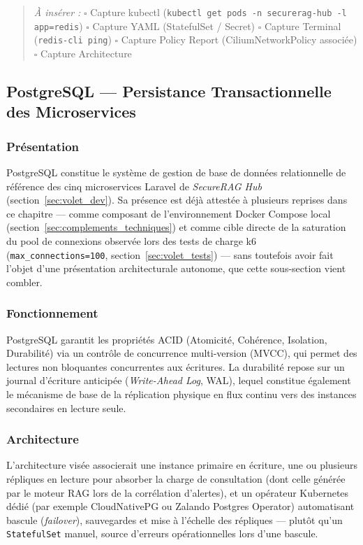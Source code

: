 \begin{quote}
\scriptsize
\textit{À insérer :} \quad
$\square$ Capture kubectl (\texttt{kubectl get pods -n securerag-hub -l app=redis}) \quad
$\square$ Capture YAML (StatefulSet / Secret) \quad
$\square$ Capture Terminal (\texttt{redis-cli ping}) \quad
$\square$ Capture Policy Report (CiliumNetworkPolicy associée) \quad
$\square$ Capture Architecture
\end{quote}


\subsection{PostgreSQL — Persistance Transactionnelle des Microservices}
\label{subsec:postgresql_v2}

\subsubsection{Présentation}
PostgreSQL constitue le système de gestion de base de données relationnelle de référence des cinq microservices Laravel de \textit{SecureRAG Hub} (section~\ref{sec:volet_dev}). Sa présence est déjà attestée à plusieurs reprises dans ce chapitre — comme composant de l'environnement Docker Compose local (section~\ref{sec:complements_techniques}) et comme cible directe de la saturation du pool de connexions observée lors des tests de charge k6 (\texttt{max\_connections=100}, section~\ref{sec:volet_tests}) — sans toutefois avoir fait l'objet d'une présentation architecturale autonome, que cette sous-section vient combler.

\subsubsection{Fonctionnement}
PostgreSQL garantit les propriétés ACID (Atomicité, Cohérence, Isolation, Durabilité) via un contrôle de concurrence multi-version (MVCC), qui permet des lectures non bloquantes concurrentes aux écritures. La durabilité repose sur un journal d'écriture anticipée (\textit{Write-Ahead Log}, WAL), lequel constitue également le mécanisme de base de la réplication physique en flux continu vers des instances secondaires en lecture seule.

\subsubsection{Architecture}
L'architecture visée associerait une instance primaire en écriture, une ou plusieurs répliques en lecture pour absorber la charge de consultation (dont celle générée par le moteur RAG lors de la corrélation d'alertes), et un opérateur Kubernetes dédié (par exemple CloudNativePG ou Zalando Postgres Operator) automatisant bascule (\textit{failover}), sauvegardes et mise à l'échelle des répliques — plutôt qu'un \texttt{StatefulSet} manuel, source d'erreurs opérationnelles lors d'une bascule.

